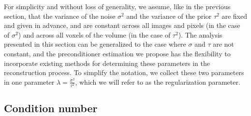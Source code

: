 \documentclass{article}
\begin{document}
For simplicity and without loss of generality, we assume, like in the previous section, 
that the variance of the noise $\sigma^2$ and the variance of the prior $\tau^2$ 
are fixed and given in advance, and are constant across all images and pixels 
(in the case of $\sigma^2$) and across all voxels of the volume (in the case of $\tau^2$). 
The analysis presented in this section can be generalized to the case where
$\sigma$ and $\tau$ are not constant, and the preconditioner estimation we propose 
has the flexibility to incorporate existing methods for determining
these parameters in the reconstruction process. To simplify the notation, 
we collect these two parameters in one parameter $\lambda = \frac{\sigma^2}{\tau^2}$, 
which we will refer to as the regularization parameter.

\subsection{Condition number}
\label{sec:cond}
\end{document}
